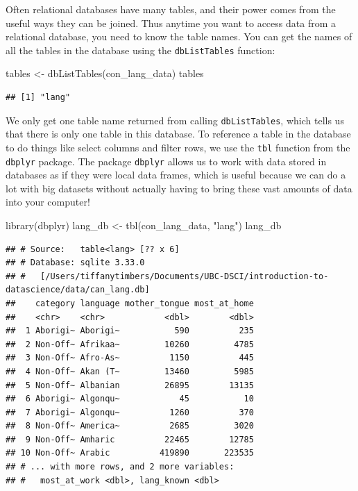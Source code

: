 \documentclass[
]{krantz}
\makeatletter
\newenvironment{Shaded}{\begin{snugshade}}{\end{snugshade}}
\newcommand{\FunctionTok}[1]{\textcolor[rgb]{0,0,0}{#1}}
\newcommand{\NormalTok}[1]{#1}
\newcommand{\OtherTok}[1]{\textcolor[rgb]{0.37,0.37,0.37}{#1}}
\newcommand{\StringTok}[1]{\textcolor[rgb]{0.5,0.5,0.5}{#1}}
\newenvironment{kframe}{%
\medskip{}
\setlength{\fboxsep}{.8em}
 \def\at@end@of@kframe{}%
 \ifinner\ifhmode%
  \def\at@end@of@kframe{\end{minipage}}%
  \begin{minipage}{\columnwidth}%
 \fi\fi%
 \def\FrameCommand##1{\hskip\@totalleftmargin \hskip-\fboxsep
 \colorbox{shadecolor}{##1}\hskip-\fboxsep
     \hskip-\linewidth \hskip-\@totalleftmargin \hskip\columnwidth}%
 \MakeFramed {\advance\hsize-\width
   \@totalleftmargin\z@ \linewidth\hsize
   \@setminipage}}%
 {\par\unskip\endMakeFramed%
 \at@end@of@kframe}
\renewenvironment{Shaded}{\begin{kframe}}{\end{kframe}}
\makeatother
\begin{document}
Often relational databases have many tables, and their power comes from the useful ways they can be joined. Thus anytime you want to access data from a relational database, you need to know the table names. You can get the names of all the tables in the database using the \texttt{dbListTables} function:

\begin{Shaded}
\begin{Highlighting}[]
\NormalTok{tables }\OtherTok{\textless{}{-}} \FunctionTok{dbListTables}\NormalTok{(con\_lang\_data)}
\NormalTok{tables}
\end{Highlighting}
\end{Shaded}

\begin{verbatim}
## [1] "lang"
\end{verbatim}

We only get one table name returned from calling \texttt{dbListTables}, which tells us that there is only one table in this database. To reference a table in the database to do things like select columns and filter rows, we use the \texttt{tbl} function from the \texttt{dbplyr} package. The package \texttt{dbplyr} allows us to work with data stored in databases as if they were local data frames, which is useful because we can do a lot with big datasets without actually having to bring these vast amounts of data into your computer!

\begin{Shaded}
\begin{Highlighting}[]
\FunctionTok{library}\NormalTok{(dbplyr)}
\NormalTok{lang\_db }\OtherTok{\textless{}{-}} \FunctionTok{tbl}\NormalTok{(con\_lang\_data, }\StringTok{"lang"}\NormalTok{)}
\NormalTok{lang\_db}
\end{Highlighting}
\end{Shaded}

\begin{verbatim}
## # Source:   table<lang> [?? x 6]
## # Database: sqlite 3.33.0
## #   [/Users/tiffanytimbers/Documents/UBC-DSCI/introduction-to-datascience/data/can_lang.db]
##    category language mother_tongue most_at_home
##    <chr>    <chr>            <dbl>        <dbl>
##  1 Aborigi~ Aborigi~           590          235
##  2 Non-Off~ Afrikaa~         10260         4785
##  3 Non-Off~ Afro-As~          1150          445
##  4 Non-Off~ Akan (T~         13460         5985
##  5 Non-Off~ Albanian         26895        13135
##  6 Aborigi~ Algonqu~            45           10
##  7 Aborigi~ Algonqu~          1260          370
##  8 Non-Off~ America~          2685         3020
##  9 Non-Off~ Amharic          22465        12785
## 10 Non-Off~ Arabic          419890       223535
## # ... with more rows, and 2 more variables:
## #   most_at_work <dbl>, lang_known <dbl>
\end{verbatim}
\end{document}
